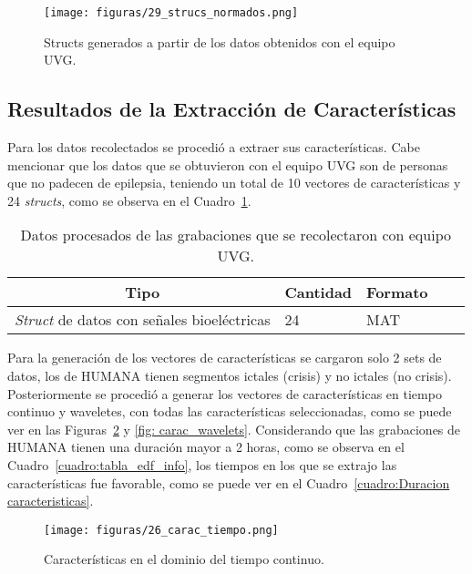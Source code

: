 \begin{figure}[t]
    \centering
    \texttt{[image: figuras/29\_strucs\_normados.png]}
    \caption{Structs generados a partir de los datos obtenidos con el equipo UVG.}
    \label{fig: Struct_normado}
\end{figure}

\subsection{Resultados de la Extracción de Características}
Para los datos recolectados se procedió a extraer sus características. Cabe mencionar que los datos que se obtuvieron con el equipo UVG son de personas que no padecen de epilepsia, teniendo un total de 10 vectores de características y 24 \textit{structs}, como se observa en el Cuadro~\ref{cuadro:tabla datos features UVG}.

\begin{table}[H]
\begin{center}
    \begin{tabular}{|l|l|l|l|l|}
    \hline
        \multicolumn{1}{|c|}{\textbf{Tipo}} & \multicolumn{1}{c|}{\textbf{Cantidad}} & \multicolumn{1}{c|}{\textbf{Formato}}\\ \hline
        \textit{Struct} de datos con señales bioeléctricas & 24  & MAT \\ \hline
    \end{tabular}
    \caption[Datos procesados en nube con equipo UVG]{Datos procesados de las grabaciones que se recolectaron con equipo UVG.} 
    \label{cuadro:tabla datos features UVG}
\end{center}
\end{table}

Para la generación de los vectores de características se cargaron solo 2 sets de datos, los de HUMANA tienen segmentos ictales (crisis) y no ictales (no crisis).
Posteriormente se procedió a generar los vectores de características en tiempo continuo y waveletes, con todas las características seleccionadas, como se puede ver en las Figuras~\ref{fig: carac_tiempo} y \ref{fig: carac_wavelets}. Considerando que las grabaciones de HUMANA tienen una duración mayor a 2 horas, como se observa en el Cuadro~\ref{cuadro:tabla_edf_info}, los tiempos en los que se extrajo las características fue favorable, como se puede ver en el Cuadro~\ref{cuadro:Duracion caracteristicas}. 

\begin{figure}[H]
    \centering
    \texttt{[image: figuras/26\_carac\_tiempo.png]}
    \caption{Características en el dominio del tiempo continuo.}
    \label{fig: carac_tiempo}
\end{figure}

